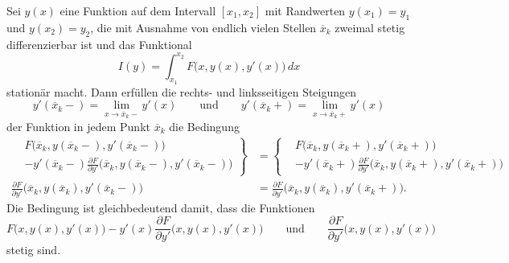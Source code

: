 \begin{satz}
\label{buch:nichtdiff:splines:satz:weierstrass-erdmann}
Sei $y(x)$ eine Funktion auf dem Intervall $[x_1,x_2]$ mit Randwerten
$y(x_1)=y_1$ und $y(x_2)=y_2$, die mit Ausnahme von endlich
vielen Stellen $\overline{x}_k$ zweimal
stetig differenzierbar ist und das Funktional
\[
I(y)
=
\int_{x_1}^{x_2}
F\bigl(x,y(x),y'(x)\bigr)
\,dx
\]
stationär macht.
Dann erfüllen die rechts- und linksseitigen Steigungen
\[
y'(\overline{x}_k-) = \lim_{x\to \overline{x}_k-} y'(x)
\qquad\text{und}\qquad
y'(\overline{x}_k+) = \lim_{x\to \overline{x}_k+} y'(x)
\]
der Funktion in jedem Punkt $\overline{x}_k$ die Bedingung
\begin{equation}
\begin{aligned}
\left.
\begin{aligned}
&F\bigl(\overline{x}_k,y(\overline{x}_k-),y'(\overline{x}_k-)\bigr)
\\
&- 
y'(\overline{x}_k-)
\frac{\partial F}{\partial y'}\bigl(\overline{x}_k,y(\overline{x}_k-), y'(\overline{x}_k-)\bigr)
\end{aligned}\right\}
&=
\left\{
\begin{aligned}
&F\bigl(\overline{x}_k,y(\overline{x}_k+),y'(\overline{x}_k+)\bigr)
\\
&- 
y'(\overline{x}_k+)
\frac{\partial F}{\partial y'}\bigl(\overline{x}_k,y(\overline{x}_k+), y'(\overline{x}_k+)\bigr)
\end{aligned}
\right.
\\
\frac{\partial F}{\partial y'}\bigl(
\overline{x}_k,
y(\overline{x}_k),
y'(\overline{x}_k-)
\bigr)
&=
\frac{\partial F}{\partial y'}\bigl(
\overline{x}_k,
y(\overline{x}_k),
y'(\overline{x}_k+)
\bigr).
\end{aligned}
\label{buch:nichtdiff:eckenedingung:eqn:we}
\end{equation}
Die Bedingung ist gleichbedeutend damit, dass die Funktionen
\[
F\bigl(x,y(x),y'(x)\bigr)
-
y'(x)\frac{\partial F}{\partial y'}\bigl(x,y(x),y'(x)\bigr)
\qquad\text{und}\qquad
\frac{\partial F}{\partial y'}\bigl(x,y(x),y'(x)\bigr)
\]
stetig sind.
\end{satz}


